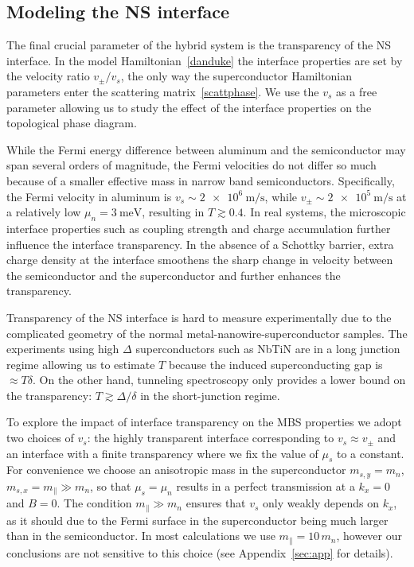 \documentclass[twocolumn, notitlepage, 10pt, aps, floatfix, showpacs, prb, citeautoscript]{revtex4-1}
\newcommand{\comment}[1]{}
\begin{document}
\subsection{Modeling the NS interface}
\label{sub:interf}

\comment{Interface transparency is the main parameter that we want to simulate correctly, and it is set by the velocity ratio in the model}
The final crucial parameter of the hybrid system is the transparency of the NS interface.
In the model Hamiltonian~\eqref{danduke} the interface properties are set by the velocity ratio $v_\pm/v_s$, the only way the superconductor Hamiltonian parameters enter the scattering matrix~\eqref{scattphase}.
We use the $v_s$ as a free parameter allowing us to study the effect of the interface properties on the topological phase diagram.

\comment{A transparent interface is not unreasonable to expect due to the charge accumulation}
While the Fermi energy difference between aluminum and the semiconductor may span several orders of magnitude, the Fermi velocities do not differ so much because of a smaller effective mass in narrow band semiconductors.
Specifically, the Fermi velocity in aluminum is $v_s \sim \SI{2e6}{\m/\s}$, while $v_\pm \sim \SI{2e5}{\m/\s}$ at a relatively low $\mu_n = \SI{3}{\meV}$, resulting in $T\gtrsim 0.4$.
In real systems, the microscopic interface properties such as coupling strength and charge accumulation further influence the interface transparency.
In the absence of a Schottky barrier, extra charge density at the interface smoothens the sharp change in velocity between the semiconductor and the superconductor and further enhances the transparency.

\comment{Long junction allows to determine transparency, while the observed short junction behavior only puts a lower bound on it}
Transparency of the NS interface is hard to measure experimentally due to the complicated geometry of the normal metal-nanowire-superconductor samples.
The experiments using high $\Delta$ superconductors such as NbTiN are in a long junction regime allowing us to estimate $T$ because the induced superconducting gap is $\approx T \delta$.
On the other hand, tunneling spectroscopy only provides a lower bound on the transparency: $T \gtrsim \Delta/\delta$ in the short-junction regime.

\comment{Therefore we check what happens with a fully transparent interface as well as semi-reflective interface}
To explore the impact of interface transparency on the MBS properties we adopt two choices of $v_s$: the highly transparent interface corresponding to $v_s \approx v_\pm$ and an interface with a finite transparency where we fix the value of $\mu_s$ to a constant.
For convenience we choose an anisotropic mass in the superconductor $m_{s,y} = m_n$, $m_{s,x} = m_\parallel \gg m_n$, so that $\mu_s = \mu_n$ results in a perfect transmission at a $k_x=0$ and $B = 0$.
The condition $m_\parallel \gg m_n$ ensures that $v_s$ only weakly depends on $k_x$, as it should due to the Fermi surface in the superconductor being much larger than in the semiconductor.
In most calculations we use $m_\parallel = 10\,m_n$, however our conclusions are not sensitive to this choice (see Appendix~\ref{sec:app} for details).
\end{document}
